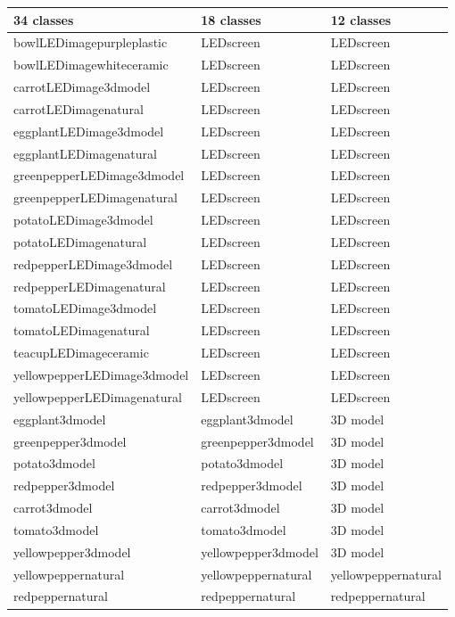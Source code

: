 \documentclass[12pt,a4paper,oneside]{report}
\begin{document}
\begin{table}
\centering
\footnotesize
\begin{tabular}{p{7.5cm}p{7.5cm}p{7.5cm}}
\hline
\textbf{34 classes} & \textbf{18 classes} & \textbf{12 classes} \\
\hline
bowlLEDimagepurpleplastic & LEDscreen & LEDscreen \\
bowlLEDimagewhiteceramic & LEDscreen & LEDscreen \\
carrotLEDimage3dmodel & LEDscreen & LEDscreen \\
carrotLEDimagenatural & LEDscreen & LEDscreen \\
eggplantLEDimage3dmodel & LEDscreen & LEDscreen \\
eggplantLEDimagenatural & LEDscreen & LEDscreen \\
greenpepperLEDimage3dmodel & LEDscreen & LEDscreen \\
greenpepperLEDimagenatural & LEDscreen & LEDscreen \\
potatoLEDimage3dmodel & LEDscreen & LEDscreen \\
potatoLEDimagenatural & LEDscreen & LEDscreen \\
redpepperLEDimage3dmodel & LEDscreen & LEDscreen \\
redpepperLEDimagenatural & LEDscreen & LEDscreen \\
tomatoLEDimage3dmodel & LEDscreen & LEDscreen \\
tomatoLEDimagenatural & LEDscreen & LEDscreen \\
teacupLEDimageceramic & LEDscreen & LEDscreen \\
yellowpepperLEDimage3dmodel & LEDscreen & LEDscreen \\
yellowpepperLEDimagenatural & LEDscreen & LEDscreen \\
eggplant3dmodel & eggplant3dmodel & 3D model \\
greenpepper3dmodel & greenpepper3dmodel & 3D model \\
potato3dmodel & potato3dmodel & 3D model \\
redpepper3dmodel & redpepper3dmodel & 3D model \\
carrot3dmodel & carrot3dmodel & 3D model \\
tomato3dmodel & tomato3dmodel & 3D model \\
yellowpepper3dmodel & yellowpepper3dmodel & 3D model \\
yellowpeppernatural & yellowpeppernatural & yellowpeppernatural \\
redpeppernatural & redpeppernatural & redpeppernatural \\

\end{tabular}
\end{table}
\end{document}
